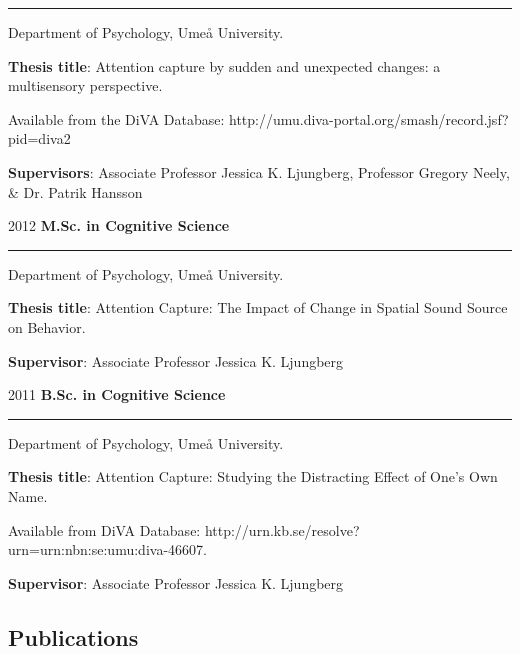 \documentclass[]{article}
\begin{document}
\hrule

\begin{changemargin}{2.3cm}{2.4cm}

Department of Psychology, Umeå University.

\textbf{Thesis title}: Attention capture by sudden and unexpected changes: a multisensory perspective. 

Available from the DiVA Database: \sloppy http://umu.diva-portal.org/smash/record.jsf?pid=diva2%

\textbf{Supervisors}: Associate Professor Jessica K. Ljungberg, Professor Gregory Neely, \& Dr. Patrik Hansson
\end{changemargin}

2012 \hspace{1.5cm}\textbf{M.Sc. in Cognitive Science}\vspace{1mm}

\hrule
\begin{changemargin}{2.3cm}{2.4cm}

Department of Psychology, Umeå University.

\textbf{Thesis title}: Attention Capture: The Impact of Change in Spatial Sound Source on Behavior. 
    
\textbf{Supervisor}: Associate Professor Jessica K. Ljungberg
\end{changemargin}

2011 \hspace{1.5cm}\textbf{B.Sc. in Cognitive Science}\vspace{1mm}

\hrule

\begin{changemargin}{2.3cm}{2.4cm}

Department of Psychology, Umeå University.

\textbf{Thesis title}:  Attention Capture: Studying the Distracting Effect of One’s Own Name.

Available from DiVA Database: \sloppy http://urn.kb.se/resolve?urn=urn:nbn:se:umu:diva-46607.
    
\textbf{Supervisor}: Associate Professor Jessica K. Ljungberg
\end{changemargin}

\hypertarget{publications}{%
\subsection{Publications}\label{publications}}
\end{document}
